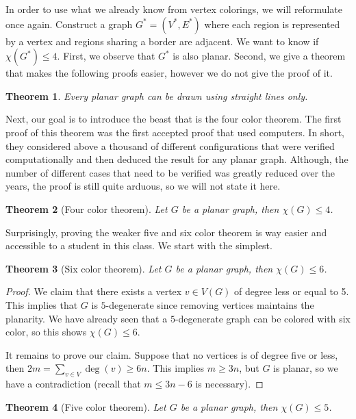 \documentclass{tufte-handout}
\newtheorem{thm}{Theorem}
\theoremstyle{definition}
\theoremstyle{remark}
\begin{document}
In order to use what we already know from vertex colorings, we will reformulate once again. Construct a graph $G^* = (V^*, E^*)$ where each region is represented by a vertex and regions sharing a border are adjacent. We want to know if $\chi(G^*) \leq 4$. First, we observe that $G^*$ is also planar. Second, we give a theorem that makes the following proofs easier, however we do not give the proof of it.
\begin{thm}
	Every planar graph can be drawn using straight lines only.
\end{thm}
Next, our goal is to introduce the beast that is the four color theorem. The first proof of this theorem was the first accepted proof that used computers. In short, they considered above a thousand of different configurations that were verified computationally and then deduced the result for any planar graph. Although, the number of different cases that need to be verified was greatly reduced over the years, the proof is still quite arduous, so we will not state it here.
\begin{thm}[Four color theorem]
	Let $G$ be a planar graph, then $\chi(G) \leq 4$.
\end{thm}
Surprisingly, proving the weaker five and six color theorem is way easier and accessible to a student in this class. We start with the simplest.
\begin{thm}[Six color theorem]
	Let $G$ be a planar graph, then $\chi(G) \leq 6$.
\end{thm}
\begin{proof}
	We claim that there exists a vertex $v \in V(G)$ of degree less or equal to 5. This implies that $G$ is $5$-degenerate since removing vertices maintains the planarity. We have already seen that a $5$-degenerate graph can be colored with six color, so this shows $\chi(G) \leq 6$.
	
	It remains to prove our claim. Suppose that no vertices is of degree five or less, then $2m = \sum_{v \in V} \deg(v) \geq 6n$. This implies $m \geq 3n$, but $G$ is planar, so we have a contradiction (recall that $m \leq 3n-6$ is necessary).
\end{proof}
\begin{thm}[Five color theorem]
	Let $G$ be a planar graph, then $\chi(G) \leq 5$.
\end{thm}
\end{document}
